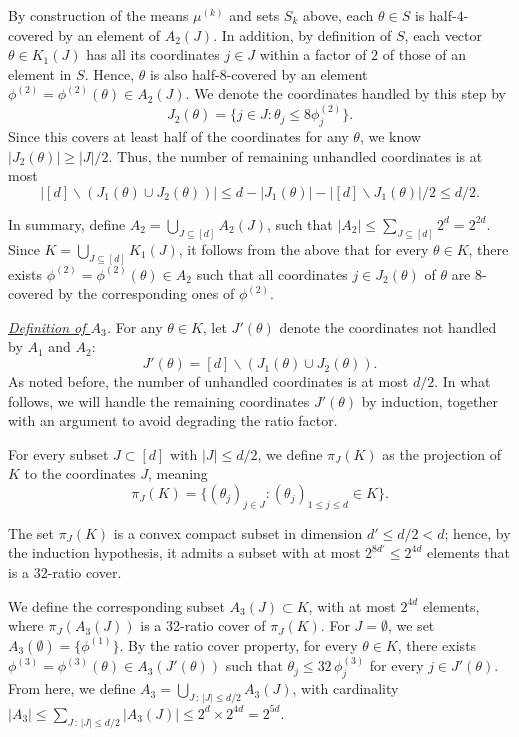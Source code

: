 \documentclass[11pt]{article}
\newcommand{\pp}{\,:\,}
\renewcommand{\leq}{\leqslant}
\renewcommand{\geq}{\geqslant}
\renewcommand{\le}{\leqslant}
\theoremstyle{definition}
\theoremstyle{remark}
\begin{document}
  By construction of the means $\mu^{(k)}$ and sets $S_k$ above, each $\theta \in S$ is half-$4$-covered by an element of $A_2 (J)$.
  In addition, by definition of $S$, each vector $\theta \in K_1 (J)$ has all its coordinates $j \in J$ within a factor of $2$ of those of an element in $S$. Hence, $\theta$ is also half-$8$-covered by an element $\phi^{(2)} = \phi^{(2)} (\theta) \in A_2 (J)$.
  We denote the coordinates handled by this step by
  \[J_2 (\theta) = \{ j \in J : \theta_j \leq 8 \phi_j^{(2)} \}.\]
  Since this covers at least half of the coordinates for any $\theta$, we know $|J_2 (\theta)| \geq |J|/2$. Thus, the number of remaining unhandled coordinates is at most
  \begin{equation*}
      |[d] \backslash (J_1(\theta) \cup J_2(\theta)) | \le d - |J_1(\theta)| - |[d] \backslash J_1(\theta)|/2 \le d/2.
  \end{equation*}

  In summary, define $A_2 = \bigcup_{J \subseteq [d]} A_2 (J)$, such that $|A_2| \leq \sum_{J \subseteq [d]} 2^d = 2^{2d}$.
  Since $K = \bigcup_{J \subseteq [d]} K_1 (J)$, it follows from the above that for every $\theta \in K$, there exists $\phi^{(2)} = \phi^{(2)} (\theta) \in A_2$ such that all coordinates
  $j \in J_2 (\theta)$ of $\theta$ are $8$-covered by the corresponding ones of $\phi^{(2)}$.

  \emph{\underline{Definition of $A_3$}.}
  For any $\theta \in K$, let $J'(\theta)$ denote the coordinates not handled by $A_1$ and $A_2$:
  \[ J'(\theta) = [d] \backslash (J_1(\theta) \cup J_2(\theta)).\]
  As noted before, the number of unhandled coordinates is at most $d/2$.
  In what follows, we will handle the remaining coordinates $J'(\theta)$ by induction, together with an argument to avoid degrading the ratio factor.
  
  For every subset $J \subset [d]$ with $|J| \leq d/2$, we define $\pi_J(K)$ as the projection of $K$ to the coordinates $J$, meaning
  \[ \pi_J(K) = \{ (\theta_j)_{j \in J} : (\theta_j)_{1 \le j \le d} \in K \}.\]
  
  The set $\pi_J(K)$ is a convex compact subset in dimension $d' \leq d/2 < d$; hence, by the induction hypothesis, it admits a subset with at most $2^{8 d'} \leq 2^{4d}$ elements that is a $32$-ratio cover.
  
  We define the corresponding subset $A_3 (J) \subset K$, with at most $2^{4d}$ elements, where $\pi_J (A_3 (J))$ is a 32-ratio cover of $\pi_J (K)$. For $J = \emptyset$, we set $A_3 (\emptyset) = \{\phi^{(1)}\}$.
  By the ratio cover property, for every $\theta \in K$, there exists $\phi^{(3)} = \phi^{(3)} (\theta) \in A_3 (J'(\theta))$ such that $\theta_j \leq 32 \, \phi_{j}^{(3)}$ for every $j \in J'(\theta)$.
  From here, we define $A_3 = \bigcup_{J \pp |J| \leq d/2} A_3 (J)$, with cardinality $|A_3| \leq \sum_{J \pp |J| \leq d/2} |A_3 (J)| \leq 2^d \times 2^{4 d} = 2^{5 d}$.
\end{document}
